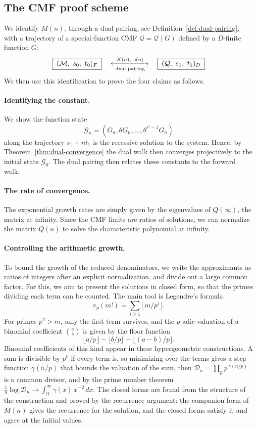 \documentclass[oneside,english,11pt]{amsart}
\begin{document}
\subsection{The CMF proof scheme}
\label{cmf proof stratergy}
We identify $M(n)$, through a dual pairing, see Definition~\ref{def:dual-pairing}, with a trajectory of a
special-function CMF $\mathcal Q=\mathcal Q(G)$ defined by a $D$-finite
function $G$:
\[
  \boxed{\;(\mathcal M,\ s_0,\ t_0)_F\;}
  \quad\xleftrightarrow[\ \text{dual pairing}\ ]{\ K(n),\ c(n)\ }\quad
  \boxed{\;(\mathcal Q,\ s_1,\ t_1)_D\;}
\]
We then use this identification to prove the four claims as follows.

\paragraph{Identifying the constant.}
\label{par: constant}
We show the function state 
\[\mathcal G_n=(G_n,\theta G_n,\dots,\theta^{r'-1}G_n)\]
along the trajectory $s_1+nt_1$ is the recessive solution to the system. 
Hence, by Theorem~\ref{thm:dual-convergence} the dual walk then converges projectively to the initial state $\mathcal G_0$. The dual pairing then relates these constants to the forward walk.

\paragraph{The rate of convergence.}
The exponential growth rates are simply given by the eigenvalues of $Q(\infty)$, the matrix at infinity. Since the CMF limits are ratios of solutions, we can normalize the matrix $Q(n)$ to solve the characteristic polynomial at infinity.

\paragraph{Controlling the arithmetic growth.}\label{par: arithmetic control}
To bound the growth of the reduced denominators, we write the approximants as ratios of integers after an explicit normalization, and divide out a large common factor. For this, we aim to present the solutions in closed form, so that the primes dividing each term can be counted. The main tool is Legendre's formula
\[
v_p(m!)=\sum_{i\ge1}\lfloor m/p^i\rfloor.
\]
For primes $p^2>m$, only the first term survives, and the $p$-adic valuation of a binomial coefficient $\binom ab$ is given by the floor function 
\[
\lfloor a/p\rfloor-\lfloor b/p\rfloor-\lfloor(a-b)/p\rfloor.
\] 
Binomial coefficients of this kind appear in these hypergeometric constructions. 
A sum is divisible by $p^e$ if every term is, so minimizing over the terms gives a step function $\gamma(n/p)$ that bounds the valuation of the sum, then $\mathcal D_n=\prod_pp^{\,\gamma(n/p)}$ is a common divisor, and by the prime number theorem $\frac1n\log\mathcal D_n\to\int_0^\infty\gamma(x)\,x^{-2}\,dx$.
The closed forms are found from the structure of the construction and proved by the recurrence argument: the companion form of $M(n)$ gives the recurrence for the solution, and the closed forms satisfy it and agree at the initial values.
\end{document}
